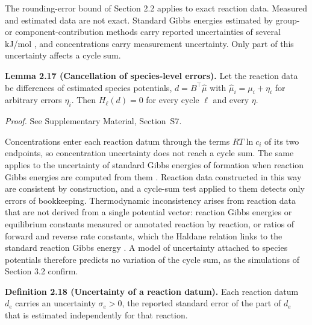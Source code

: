 \documentclass[11pt,a4paper]{article}
\theoremstyle{pstyle}
\theoremstyle{definition}
\theoremstyle{remark}
\newcommand{\hol}{H}
\begin{document}
The rounding-error bound of Section 2.2 applies to exact
reaction data. Measured and estimated data are not exact. Standard
Gibbs energies estimated by group- or component-contribution methods
carry reported uncertainties of several kJ/mol
\citep{alberty1998,noor2013,flamholz2012}, and concentrations carry
measurement uncertainty. Only part of this uncertainty affects a cycle
sum.

\par\noindent\textbf{Lemma 2.17 (Cancellation of species-level errors).}\label{lem:species-cancel} 
Let the reaction data be differences of estimated species potentials,
$d=B^{\top}\hat\mu$ with $\hat\mu_i=\mu_i+\eta_i$ for arbitrary errors
$\eta_i$. Then $\hol_\ell(d)=0$ for every cycle $\ell$ and every $\eta$.
\par

\noindent\emph{Proof.} See Supplementary Material, Section~S7.

Concentrations enter each reaction datum through the terms $RT\ln c_i$
of its two endpoints, so concentration uncertainty does not reach a
cycle sum. The same applies to the uncertainty of standard Gibbs
energies of formation when reaction Gibbs energies are computed from
them \citep{noor2013}. Reaction data constructed in this way are
consistent by construction, and a cycle-sum test applied to them detects
only errors of bookkeeping. Thermodynamic inconsistency arises from
reaction data that are not derived from a single potential vector:
reaction Gibbs energies or equilibrium constants measured or annotated
reaction by reaction, or ratios of forward and reverse rate constants,
which the Haldane relation links to the standard reaction Gibbs energy
\citep{schuster1989}. A model of uncertainty attached to species
potentials therefore predicts no variation of the cycle sum, as the
simulations of Section 3.2 confirm.

\par\noindent\textbf{Definition 2.18 (Uncertainty of a reaction datum).}\label{def:sigma} 
Each reaction datum $d_e$ carries an uncertainty $\sigma_e>0$, the
reported standard error of the part of $d_e$ that is estimated
independently for that reaction.
\par
\end{document}
